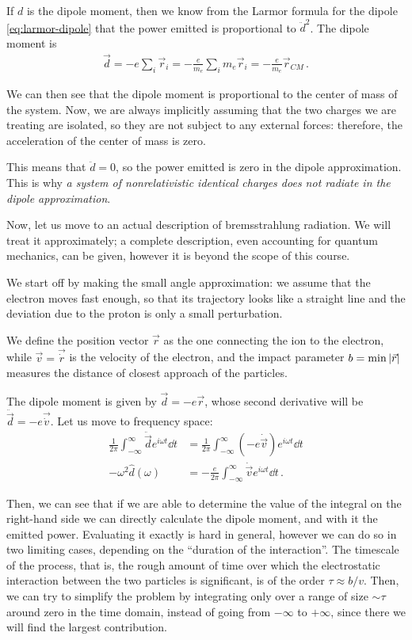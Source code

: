 \documentclass[main.tex]{subfiles}
\begin{document}
If \(d\) is the dipole moment, then we know from the Larmor formula for the dipole \eqref{eq:larmor-dipole} that the power emitted is proportional to \(\ddot{d}^2\). 
The dipole moment is 
%
\begin{align}
\vec{d} = -e \sum _{i}  \vec{r}_i = - \frac{e}{m_e} \sum _{i} m_e \vec{r}_i
= - \frac{e}{m_e} \vec{r}_{CM}
\,.
\end{align}

We can then see that the dipole moment is proportional to the center of mass of the system. 
Now, we are always implicitly assuming that the two charges we are treating are isolated, so they are not subject to any external forces: therefore, the acceleration of the center of mass is zero.

This means that \(\ddot{d} = 0\), so the power emitted is zero in the dipole approximation. 
This is why \emph{a system of nonrelativistic identical charges does not radiate in the dipole approximation}. 

Now, let us move to an actual description of bremsstrahlung radiation. 
We will treat it approximately; a complete description, even accounting for quantum mechanics, can be given, however it is beyond the scope of this course. 

We start off by making the small angle approximation: we assume that the electron moves fast enough, so that its trajectory looks like a straight line and the deviation due to the proton is only a small perturbation.

We define the position vector \(\vec{r}\) as the one connecting the ion to the electron, while \(\vec{v} = \vec{\dot{r}}\) is the velocity of the electron, and the impact parameter \(b = \min \abs{\vec{r}}\) measures the distance of closest approach of the particles. 

The dipole moment is given by \(\vec{d} = -e \vec{r}\), whose second derivative will be \(\ddot{\vec{d}} = -e \vec{\dot{v}}\). 
Let us move to frequency space: 
%
\begin{align}
\frac{1}{2 \pi } \int_{-\infty}^{\infty } \ddot{\vec{d}} e^{i \omega t} \dd{t} &= \frac{1}{2 \pi } \int_{-\infty }^{\infty } (- e \dot{\vec{v}})  e^{i \omega t} \dd{t} \\
- \omega^2 \hat{d} (\omega ) &= - \frac{e}{2 \pi } \int_{-\infty }^{\infty} \dot{\vec{v}} e^{i \omega t} \dd{t}
\,.
\end{align}

Then, we can see that if we are able to determine the value of the integral on the right-hand side we can directly calculate the dipole moment, and with it the emitted power. 
Evaluating it exactly is hard in general, however we can do so in two limiting cases, depending on the ``duration of the interaction''.
The timescale of the process, that is, the rough amount of time over which the electrostatic interaction between the two particles is significant, is of the order \(\tau \approx b / v\). 
Then, we can try to simplify the problem by integrating only over a range of size \(\sim \tau \) around zero in the time domain, instead of going from \(- \infty \) to \(+ \infty \), since there we will find the largest contribution. 
\end{document}
